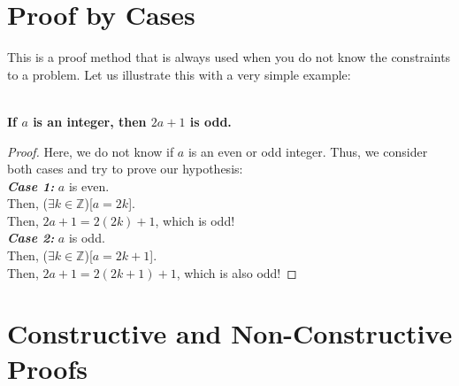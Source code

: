 \section{Proof by Cases}
This is a proof method that is always used when you do not know the constraints
to a problem. Let us illustrate this with a very simple example: \\  \\
\begin{center}
    \textbf{If $a$ is an integer, then $2a + 1$ is odd.}
\end{center}
\begin{proof}
    Here, we do not know if $a$ is an even or odd integer. Thus, we consider
    both cases and try to prove our hypothesis: \\
    \textbf{\emph{Case 1:}} $a$ is even. \\
    \indent Then, ($\exists k \in \mathbb{Z}$)[$a = 2k$]. \\
    \indent Then, $2a + 1 = 2(2k) + 1$, which is odd! \\
    \noindent
    \textbf{\emph{Case 2:}} $a$ is odd. \\
    \indent Then, ($\exists k \in \mathbb{Z}$)[$a = 2k + 1$]. \\
    \indent Then, $2a + 1 = 2(2k + 1) + 1$, which is also odd!
    \noindent

\end{proof}
\section{Constructive and Non-Constructive Proofs}
